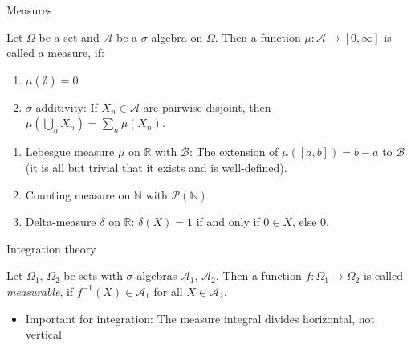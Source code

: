 \documentclass{beamer}
\newcommand{\RR}{\mathbb{R}}
\newcommand{\NN}{\mathbb{N}}
\begin{document}
\begin{frame}{Measures}
  \begin{definition}[measure]
    Let $\Omega$ be a set and $\mathcal{A}$ be a $\sigma$-algebra on
    $\Omega$. Then a function $\mu: \mathcal{A} \to [0, \infty]$ is called a
    measure, if:
    \begin{enumerate}
    \item $\mu(\emptyset) = 0$
    \item $\sigma$-additivity: If $X_n \in \mathcal{A}$ are pairwise disjoint,
      then $\mu(\bigcup_n X_n) = \sum_n \mu(X_n)$.
    \end{enumerate}
  \end{definition}

  \begin{example}
    \begin{enumerate}
    \item Lebesgue measure $\mu$ on $\RR$ with $\mathcal{B}$: The extension of
      $\mu([a,b])=b-a$ to $\mathcal{B}$ (it is all but trivial that it exists
      and is well-defined).
    \item Counting measure on $\NN$ with $\mathcal{P}(\NN)$
    \item Delta-measure $\delta$ on $\RR$: $\delta(X)=1$ if and only if $0 \in
      X$, else 0.
    \end{enumerate}
  \end{example}
\end{frame}

\begin{frame}{Integration theory}
  \begin{definition}
    Let $\Omega_1$, $\Omega_2$ be sets with $\sigma$-algebras $\mathcal{A}_1$,
    $\mathcal{A}_2$. Then a function $f: \Omega_1 \to \Omega_2$ is called
    \textit{measurable}, if $f^{-1}(X) \in \mathcal{A}_1$ for all $X \in
    \mathcal{A}_2$.
  \end{definition}
  \begin{itemize}
  \item Important for integration: The measure integral divides
     horizontal, not vertical
  \end{itemize}
\end{frame}
\end{document}
